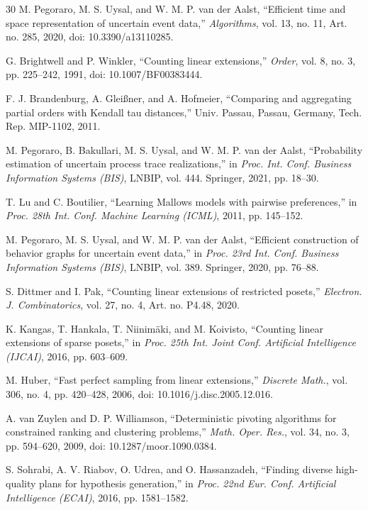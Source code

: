 \documentclass{ieeeaccess}
\begin{document}
\begin{thebibliography}{30}
 M. Pegoraro, M. S. Uysal, and W. M. P. van der Aalst, ``Efficient time and space representation of uncertain event data,'' \emph{Algorithms}, vol. 13, no. 11, Art. no. 285, 2020, doi: 10.3390/a13110285.

 G. Brightwell and P. Winkler, ``Counting linear extensions,'' \emph{Order}, vol. 8, no. 3, pp. 225--242, 1991, doi: 10.1007/BF00383444.

 F. J. Brandenburg, A. Glei{\ss}ner, and A. Hofmeier, ``Comparing and aggregating partial orders with Kendall tau distances,'' Univ. Passau, Passau, Germany, Tech. Rep. MIP-1102, 2011.

 M. Pegoraro, B. Bakullari, M. S. Uysal, and W. M. P. van der Aalst, ``Probability estimation of uncertain process trace realizations,'' in \emph{Proc. Int. Conf. Business Information Systems (BIS)}, LNBIP, vol. 444. Springer, 2021, pp. 18--30.

 T. Lu and C. Boutilier, ``Learning Mallows models with pairwise preferences,'' in \emph{Proc. 28th Int. Conf. Machine Learning (ICML)}, 2011, pp. 145--152.

 M. Pegoraro, M. S. Uysal, and W. M. P. van der Aalst, ``Efficient construction of behavior graphs for uncertain event data,'' in \emph{Proc. 23rd Int. Conf. Business Information Systems (BIS)}, LNBIP, vol. 389. Springer, 2020, pp. 76--88.

 S. Dittmer and I. Pak, ``Counting linear extensions of restricted posets,'' \emph{Electron. J. Combinatorics}, vol. 27, no. 4, Art. no. P4.48, 2020.

 K. Kangas, T. Hankala, T. Niinim{\"a}ki, and M. Koivisto, ``Counting linear extensions of sparse posets,'' in \emph{Proc. 25th Int. Joint Conf. Artificial Intelligence (IJCAI)}, 2016, pp. 603--609.

 M. Huber, ``Fast perfect sampling from linear extensions,'' \emph{Discrete Math.}, vol. 306, no. 4, pp. 420--428, 2006, doi: 10.1016/j.disc.2005.12.016.

 A. van Zuylen and D. P. Williamson, ``Deterministic pivoting algorithms for constrained ranking and clustering problems,'' \emph{Math. Oper. Res.}, vol. 34, no. 3, pp. 594--620, 2009, doi: 10.1287/moor.1090.0384.

 S. Sohrabi, A. V. Riabov, O. Udrea, and O. Hassanzadeh, ``Finding diverse high-quality plans for hypothesis generation,'' in \emph{Proc. 22nd Eur. Conf. Artificial Intelligence (ECAI)}, 2016, pp. 1581--1582.


\end{thebibliography}
\end{document}
